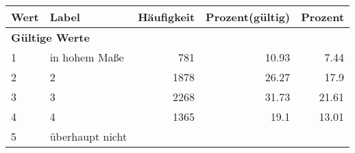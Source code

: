      \begin{longtable}{lXrrr}
     \toprule
     \textbf{Wert} & \textbf{Label} & \textbf{Häufigkeit} & \textbf{Prozent(gültig)} & \textbf{Prozent} \\
     \endhead
     \midrule
     \multicolumn{5}{l}{\textbf{Gültige Werte}}\\

     1 &
     \multicolumn{1}{X}{ in hohem Maße   } &


       \num{781} &
       \num[round-mode=places,round-precision=2]{10,93} &
         \num[round-mode=places,round-precision=2]{7,44} \\

     2 &
     \multicolumn{1}{X}{ 2   } &


       \num{1878} &
       \num[round-mode=places,round-precision=2]{26,27} &
         \num[round-mode=places,round-precision=2]{17,9} \\

     3 &
     \multicolumn{1}{X}{ 3   } &


       \num{2268} &
       \num[round-mode=places,round-precision=2]{31,73} &
         \num[round-mode=places,round-precision=2]{21,61} \\

     4 &
     \multicolumn{1}{X}{ 4   } &


       \num{1365} &
       \num[round-mode=places,round-precision=2]{19,1} &
         \num[round-mode=places,round-precision=2]{13,01} \\

     5 &
     \multicolumn{1}{X}{ überhaupt nicht   } &



\end{longtable}
